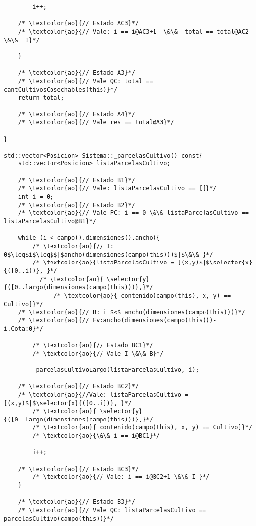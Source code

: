 \begin{lstlisting}
        i++;
    
    /* \textcolor{ao}{// Estado AC3}*/
    /* \textcolor{ao}{// Vale: i == i@AC3+1  \&\&  total == total@AC2 \&\&  I}*/
            
    }

    /* \textcolor{ao}{// Estado A3}*/	    
    /* \textcolor{ao}{// Vale QC: total == cantCultivosCosechables(this)}*/    
    return total;

    /* \textcolor{ao}{// Estado A4}*/    
    /* \textcolor{ao}{// Vale res == total@A3}*/    
    
}

std::vector<Posicion> Sistema::_parcelasCultivo() const{
    std::vector<Posicion> listaParcelasCultivo;

    /* \textcolor{ao}{// Estado B1}*/	    
    /* \textcolor{ao}{// Vale: listaParcelasCultivo == []}*/    
    int i = 0;
    /* \textcolor{ao}{// Estado B2}*/	    
    /* \textcolor{ao}{// Vale PC: i == 0 \&\& listaParcelasCultivo == listaParcelasCultivo@B1}*/    
        
    while (i < campo().dimensiones().ancho){ 
    	/* \textcolor{ao}{// I: 0$\leq$i$\leq$$|$ancho(dimensiones(campo(this)))$|$\&\& }*/
    	/* \textcolor{ao}{listaParcelasCultivo = [(x,y)$|$\selector{x}{([0..i))}, }*/		
  		  /* \textcolor{ao}{ \selector{y}{([0..largo(dimensiones(campo(this)))},}*/		
    		  /* \textcolor{ao}{ contenido(campo(this), x, y) == Cultivo]}*/
	/* \textcolor{ao}{// B: i $<$ ancho(dimensiones(campo(this)))}*/
	/* \textcolor{ao}{// Fv:ancho(dimensiones(campo(this)))-i.Cota:0}*/
    
    	/* \textcolor{ao}{// Estado BC1}*/   
    	/* \textcolor{ao}{// Vale I \&\& B}*/       	    
        
        _parcelasCultivoLargo(listaParcelasCultivo, i);

    /* \textcolor{ao}{// Estado BC2}*/   	
    /* \textcolor{ao}{//Vale: listaParcelasCultivo = [(x,y)$|$\selector{x}{([0..i])}, }*/		
    	/* \textcolor{ao}{ \selector{y}{([0..largo(dimensiones(campo(this)))},}*/		
    	/* \textcolor{ao}{ contenido(campo(this), x, y) == Cultivo]}*/    	
    	/* \textcolor{ao}{\&\& i == i@BC1}*/

        i++;
        
	/* \textcolor{ao}{// Estado BC3}*/   
    	/* \textcolor{ao}{// Vale: i == i@BC2+1 \&\& I }*/        
    }
    
    /* \textcolor{ao}{// Estado B3}*/	    
    /* \textcolor{ao}{// Vale QC: listaParcelasCultivo == parcelasCultivo(campo(this))}*/    
    

\end{lstlisting}
